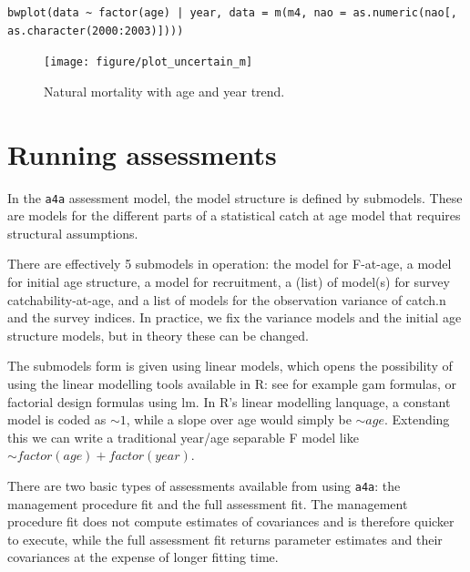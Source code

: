 \documentclass[a4paper,english,10pt]{article}\usepackage[]{graphicx}\usepackage[]{color}
\makeatletter
\newenvironment{kframe}{%
 \def\at@end@of@kframe{}%
 \ifinner\ifhmode%
  \def\at@end@of@kframe{\end{minipage}}%
  \begin{minipage}{\columnwidth}%
 \fi\fi%
 \def\FrameCommand##1{\hskip\@totalleftmargin \hskip-\fboxsep
 \colorbox{shadecolor}{##1}\hskip-\fboxsep
     \hskip-\linewidth \hskip-\@totalleftmargin \hskip\columnwidth}%
 \MakeFramed {\advance\hsize-\width
   \@totalleftmargin\z@ \linewidth\hsize
   \@setminipage}}%
 {\par\unskip\endMakeFramed%
 \at@end@of@kframe}
\newenvironment{knitrout}{}{} %
\newcommand{\code}[1]{{\texttt{#1}}}
\makeatother
\begin{document}
\begin{knitrout}
\color{fgcolor}\begin{kframe}
\begin{verbatim}
bwplot(data ~ factor(age) | year, data = m(m4, nao = as.numeric(nao[, as.character(2000:2003)])))
\end{verbatim}
\end{kframe}
\end{knitrout}


\begin{figure}[h]
\begin{knitrout}
\color{fgcolor}

{\centering \texttt{[image: figure/plot\_uncertain\_m]} 

}



\end{knitrout}

\caption{Natural mortality with age and year trend.}
\label{fig:uncertain_m}
\end{figure}

\pagebreak
\section{Running assessments}


In the \code{a4a} assessment model, the model structure is defined by submodels. These are models for the different parts of a statistical catch at age model that requires structural assumptions.

There are effectively 5 submodels in operation: the model for F-at-age, a model for initial age structure, a model for recruitment, a (list) of model(s) for survey catchability-at-age, and a list of models for the observation variance of catch.n and the survey indices. In practice, we fix the variance models and the initial age structure models, but in theory these can be changed.

The submodels form is given using linear models, which opens the possibility of using the linear modelling tools available in R: see for example gam formulas, or factorial design formulas using lm. In R's linear modelling lanquage, a constant model is coded as $\sim 1$, while a slope over age would simply be $\sim age$.  Extending this we can write a traditional year/age separable F model like $\sim factor(age) + factor(year)$.

There are two basic types of assessments available from using \code{a4a}: the management procedure fit and the full assessment fit. The management procedure fit does not compute estimates of covariances and is therefore quicker to execute, while the full assessment fit returns parameter estimates and their covariances at the expense of longer fitting time.
\end{document}
